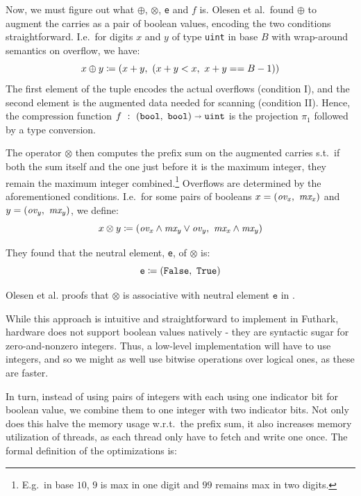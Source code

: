 Now, we must figure out what $\oplus$, $\otimes$, \texttt{e} and $f$ is. Olesen et
al.\ found $\oplus$ to augment the carries as a pair of boolean values, encoding the
two conditions straightforward. I.e.\ for digits $x$ and $y$ of type
\texttt{uint} in base $B$ with wrap-around semantics on overflow, we have:
\begin{equation}
\label{eq:oplus}
x \oplus y \coloneq (x + y,~(x + y < x,~x + y == B-1))
\end{equation}
The first element of the tuple encodes the actual overflows (condition I), and
the second element is the augmented data needed for scanning (condition
II). Hence, the compression function
$f~:~(\mathtt{bool},~\mathtt{bool}) \shortrightarrow \mathtt{uint}$ is the
projection $\pi_1$ followed by a type conversion.

The operator $\otimes$ then computes the prefix sum on the augmented carries s.t.\ if
both the sum itself and the one just before it is the maximum integer, they
remain the maximum integer combined.\footnote{E.g.\ in base $10$, $9$ is max in
  one digit and $99$ remains max in two digits.} Overflows are determined by
the aforementioned conditions. I.e.\ for some pairs of booleans
$x = (\mathit{ov_x},~\mathit{mx_{x}})$ and
$y = (\mathit{ov_y},~\mathit{mx_{y}})$, we define:
\begin{equation}
  \label{eq:otimes}
  x \otimes y \coloneq (\mathit{ov_x} \land \mathit{mx_y} \lor \mathit{ov_y},~\mathit{mx_x} \land \mathit{mx_y})
\end{equation}

They found that the neutral element, \texttt{e}, of $\otimes$ is:
\begin{equation}
  \label{eq:otimesne}
  \mathtt{e} \coloneq (\mathtt{False},~\mathtt{True})
\end{equation}

Olesen et al. proofs that $\otimes$ is associative with neutral element
$\mathtt{e}$ in \cite{DPPproject}.

While this approach is intuitive and straightforward to implement in Futhark,
hardware does not support boolean values natively - they are syntactic sugar for
zero-and-nonzero integers. Thus, a low-level implementation will have to use
integers, and so we might as well use bitwise operations over logical ones, as
these are faster.

In turn, instead of using pairs of integers with each using one indicator bit
for boolean value, we combine them to one integer with two indicator bits. Not
only does this halve the memory usage w.r.t.\ the prefix sum, it also increases
memory utilization of threads, as each thread only have to fetch and write one
once. The formal definition of the optimizations is:

